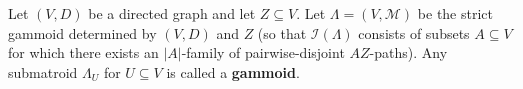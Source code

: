 Let $(V, D)$ be a directed graph and let $Z \subseteq V$. Let $\Lambda = (V, \mathcal{M})$ be the strict gammoid determined by $(V, D)$ and $Z$ (so that $\mathcal{I}(\Lambda)$ consists of subsets $A \subseteq V$ for which there exists an $|A|$-family of pairwise-disjoint $AZ$-paths). Any submatroid $\Lambda_U$ for $U \subseteq V$ is called a \textbf{gammoid}.
